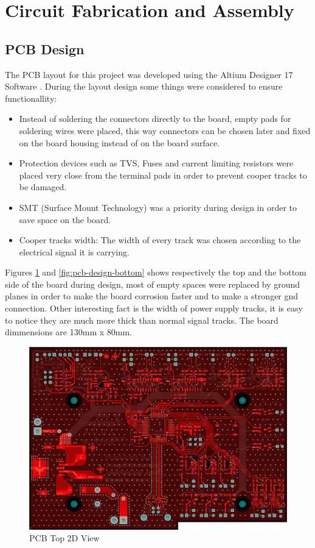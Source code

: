 \section{Circuit Fabrication and Assembly}\label{sec:printed-circuit-board}

	\subsection{PCB Design}\label{ssec:pcb-design}

		The PCB layout for this project was developed using the Altium Designer 17 Software \cite{AD17}. During the layout design some things were considered to ensure functionallity:

		\begin{itemize}
			\item Instead of soldering the connectors directly to the board, empty pads for soldering wires were placed, this way connectors can be chosen later and fixed on the board housing instead of on the board surface.\label{itm:pcb-pin-bars}
			\item Protection devices such as TVS, Fuses and current limiting resistors were placed very close from the terminal pads in order to prevent cooper tracks to be damaged.\label{itm:pcb-protection}
			\item SMT (Surface Mount Technology) was a priority during design in order to save space on the board.\label{itm:pcb-smt}
			\item Cooper tracks width: The width of every track was chosen according to the electrical signal it is carrying.\label{itm:pcb-track}
 		\end{itemize}

 		Figures \ref{fig:pcb-design-top} and \ref{fig:pcb-design-bottom} shows respectively the top and the bottom side of the board during design, most of empty spaces were replaced by ground planes in order to make the board corrosion faster and to make a stronger gnd connection. Other interesting fact is the width of power supply tracks, it is easy to notice they are much more thick than normal signal tracks. The board dimmensions are 130mm x 80mm.

		\begin{figure}[htbp]
			\centering
			\includegraphics[width=.8\textwidth]{figuras/fig-pcb-design-top}
			\caption{PCB Top 2D View}
			\label{fig:pcb-design-top}
		\end{figure}

